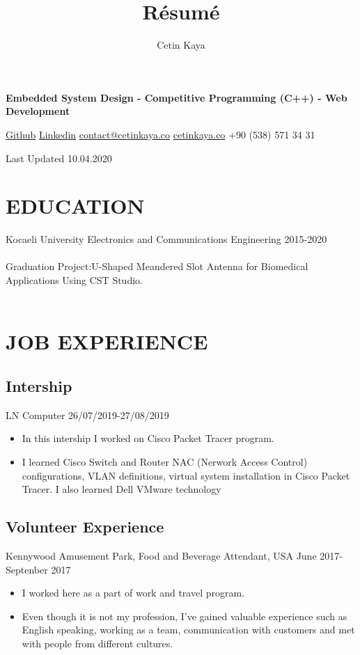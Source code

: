 \documentclass[10pt]{article}
\makeatletter
\renewcommand{\maketitle}{


\begin{center}
{\huge
\thetitle{
}
\vspace{0.7em}

}
{
\huge \bfseries
\theauthor}
\vspace{0.7em}


\bfseries{\textcolor{Mycolor5}{Embedded System Design - Competitive Programming (C++) - Web Development}} \end{center}
\faGithub\hspace{0.5em}\textcolor{Mycolor1}{\href{https://github.com/Zrrck?tab=repositories}{Github}} \hspace{1.5em}
\faLinkedin\hspace{0.5em}\textcolor{Mycolor1}{\href{https://www.linkedin.com/in/cetin-kaya/}{Linkedin}}\hspace{1.5em}
\faEnvelope\hspace{0.5em}\href{mailto:contact@cetinkaya.co}{contact@cetinkaya.co}\hspace{1.5em}
\faWordpress\hspace{0.5em}\textcolor{Mycolor1}{\href{http://cetinkaya.co}{cetinkaya.co}}\hspace{1.5em}
\faPhoneSquare\hspace{0.5em}+90 (538) 571 34 31 \hspace{1.5em}

\vspace{1em}
\begin{center}
Last Updated 10.04.2020

\end{center}
}
\makeatother
\begin{document}
\title{R\'esum\'e}
\author{Cetin Kaya}
\maketitle


\vspace{1em}

\section{EDUCATION}
Kocaeli University Electronics and Communications Engineering \hspace{15.em} 2015-2020
\\ \\
Graduation Project:U-Shaped Meandered Slot Antenna for Biomedical Applications Using CST Studio.
\\ \\

\vspace{1em}
\section{JOB EXPERIENCE}
\vspace{1em}
\subsection{Intership}
LN Computer\hspace{30.em} 26/07/2019-27/08/2019
\begin{itemize}
\itemsep0em
\item In this intership I worked on Cisco Packet Tracer program. 
\item I learned  Cisco Switch and Router NAC (Nerwork Access Control) configurations, VLAN definitions, virtual system installation in Cisco Packet Tracer. I also learned Dell VMware technology
\end{itemize}

\vspace{1em}
\subsection{Volunteer Experience}
Kennywood Amusement Park, Food and Beverage Attendant, USA \hspace{6.em}June 2017-Septenber 2017

\begin{itemize}
\itemsep0em
\item I worked here as a part of work and travel program. 
\item Even though it is not my profession, I've gained valuable
experience such as English speaking, working as a team,
communication with customers and met with people from different
cultures.
\end{itemize}
\vspace{1em}
\end{document}
